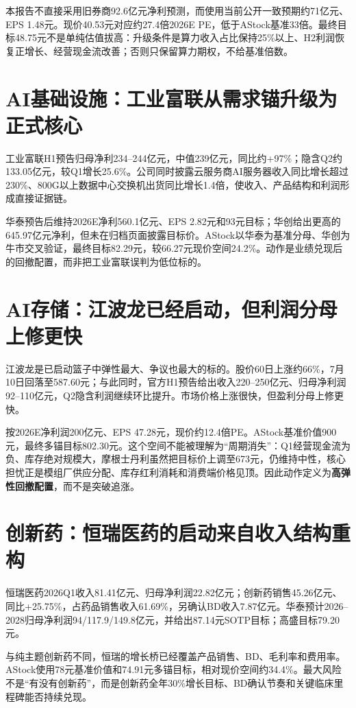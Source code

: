 本报告不直接采用旧券商92.6亿元净利预测，而使用当前公开一致预期约71亿元、EPS 1.48元。现价40.53元对应约27.4倍2026E PE，低于AStock基准33倍。最终目标48.75元不是单纯估值拔高：升级条件是算力收入占比保持25\%以上、H2利润恢复正增长、经营现金流改善；否则只保留算力期权，不给基准倍数。

\section{AI基础设施：工业富联从需求锚升级为正式核心}

工业富联H1预告归母净利234--244亿元，中值239亿元，同比约+97\%；隐含Q2约133.05亿元，较Q1增长25.6\%。公司同时披露云服务商AI服务器收入同比增长超过230\%、800G以上数据中心交换机出货同比增长1.4倍，使收入、产品结构和利润形成直接证据链。

华泰预告后维持2026E净利560.1亿元、EPS 2.82元和93元目标；华创给出更高的645.97亿元净利，但未在归档页面披露目标价。AStock以华泰为基准分母、华创为牛市交叉验证，最终目标82.29元，较66.27元现价空间24.2\%。动作是业绩兑现后的回撤配置，而非把工业富联误判为低位标的。

\section{AI存储：江波龙已经启动，但利润分母上修更快}

江波龙是已启动篮子中弹性最大、争议也最大的标的。股价60日上涨约66\%，7月10日回落至587.60元；与此同时，官方H1预告给出收入220--250亿元、归母净利润92--110亿元，Q2隐含利润继续环比提升。市场价格上涨很快，但盈利分母上修更快。

按2026E净利润200亿元、EPS 47.28元，现价约12.4倍PE。AStock基准价值900元，最终多锚目标802.30元。这个空间不能被理解为“周期消失”：Q1经营现金流为负、库存绝对规模大，摩根士丹利虽然把目标价上调至673元，仍维持中性，核心担忧正是模组厂供应分配、库存红利消耗和消费端价格见顶。因此动作定义为\textbf{高弹性回撤配置}，而不是突破追涨。

\section{创新药：恒瑞医药的启动来自收入结构重构}

恒瑞医药2026Q1收入81.41亿元、归母净利润22.82亿元；创新药销售45.26亿元、同比+25.75\%，占药品销售收入61.69\%，另确认BD收入7.87亿元。华泰预计2026--2028归母净利润94/117.9/149.8亿元，并给出87.14元SOTP目标；高盛目标79.20元。

与纯主题创新药不同，恒瑞的增长桥已经覆盖产品销售、BD、毛利率和费用率。AStock使用78元基准价值和74.91元多锚目标，相对现价空间约34.4\%。最大风险不是“有没有创新药”，而是创新药全年30\%增长目标、BD确认节奏和关键临床里程碑能否持续兑现。


